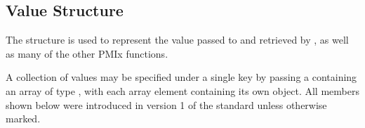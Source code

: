 \subsection{Value Structure}

The  structure is used to represent the value passed to  and retrieved by , as well as many of the other \ac{PMIx} functions.

A collection of values may be specified under a single key by passing a  containing an array of type , with each array element containing its own object. All members shown below were introduced in version 1 of the standard unless otherwise marked.

